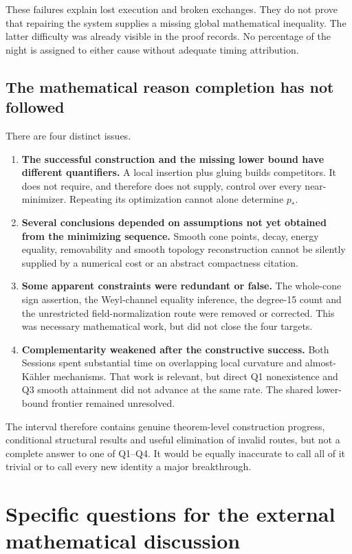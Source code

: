 \documentclass[11pt]{article}
\theoremstyle{remark}
\begin{document}
These failures explain lost execution and broken exchanges. They do not
prove that repairing the system supplies a missing global mathematical
inequality. The latter difficulty was already visible in the proof records.
No percentage of the night is assigned to either cause without adequate
timing attribution.

\subsection{The mathematical reason completion has not followed}
There are four distinct issues.
\begin{enumerate}
\item \textbf{The successful construction and the missing lower bound have
different quantifiers.} A local insertion plus gluing builds competitors.
It does not require, and therefore does not supply, control over every
near-minimizer. Repeating its optimization cannot alone determine $p_*$.
\item \textbf{Several conclusions depended on assumptions not yet obtained
from the minimizing sequence.} Smooth cone points, decay, energy equality,
removability and smooth topology reconstruction cannot be silently supplied
by a numerical cost or an abstract compactness citation.
\item \textbf{Some apparent constraints were redundant or false.}
The whole-cone sign assertion, the Weyl-channel equality inference, the
degree-15 count and the unrestricted field-normalization route were removed
or corrected. This was necessary mathematical work, but did not close the
four targets.
\item \textbf{Complementarity weakened after the constructive success.}
Both Sessions spent substantial time on overlapping local curvature and
almost-K\"ahler mechanisms. That work is relevant, but direct Q1
nonexistence and Q3 smooth attainment did not advance at the same rate.
The shared lower-bound frontier remained unresolved.
\end{enumerate}
The interval therefore contains genuine theorem-level construction progress,
conditional structural results and useful elimination of invalid routes,
but not a complete answer to one of Q1--Q4. It would be equally inaccurate to
call all of it trivial or to call every new identity a major breakthrough.

\section{Specific questions for the external mathematical discussion}
\label{sec:requests}
\end{document}
